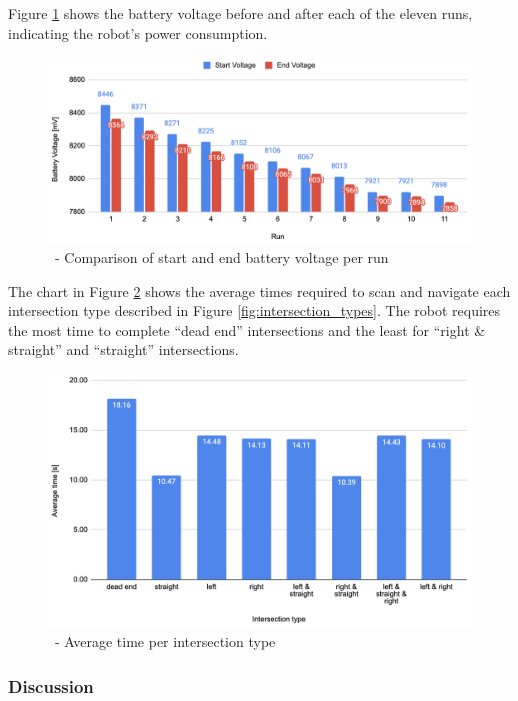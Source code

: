 Figure \ref{fig:turning-power} shows the battery voltage before and after each of the eleven runs, indicating the robot's power consumption.

\begin{figure}[!hbt]
    \centering
    \includegraphics[width=\textwidth]{resources/turning-power.png}
    \caption{\TurnRob~- Comparison of start and end battery voltage per run}
    \label{fig:turning-power}
\end{figure}

The chart in Figure \ref{fig:turning-intersection-times} shows the average times required to scan and navigate each intersection type described in Figure \ref{fig:intersection_types}. The robot requires the most time to complete “dead end” intersections and the least for “right \& straight” and “straight” intersections.

\begin{figure}[!hbt]
    \centering
    \includegraphics[width=\textwidth]{resources/turning-intersection-times.png}
    \caption{\TurnRob~- Average time per intersection type}
    \label{fig:turning-intersection-times}
\end{figure}

\subsubsection{Discussion} \label{sec:turning_discussion}

